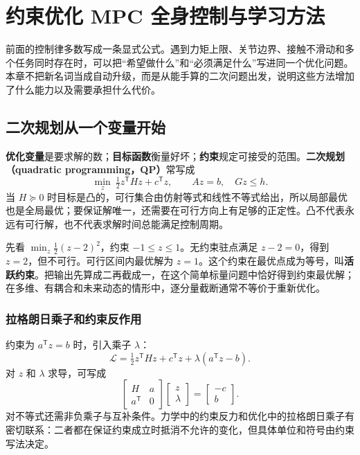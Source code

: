 \chapter{约束优化 MPC 全身控制与学习方法}
\label{ch:advanced}

前面的控制律多数写成一条显式公式。遇到力矩上限、关节边界、接触不滑动和多个任务同时存在时，可以把“希望做什么”和“必须满足什么”写进同一个优化问题。本章不把新名词当成自动升级，而是从能手算的二次问题出发，说明这些方法增加了什么能力以及需要承担什么代价。

\section{二次规划从一个变量开始}

\textbf{优化变量}是要求解的数；\textbf{目标函数}衡量好坏；\textbf{约束}规定可接受的范围。\textbf{二次规划（quadratic programming，QP）}常写成
\begin{equation}
\min_z\ \tfrac12z^\mathsf THz+c^\mathsf Tz,
\qquad Az=b,\quad Gz\le h.
\end{equation}
当 $H\succeq0$ 时目标是凸的，可行集合由仿射等式和线性不等式给出，所以局部最优也是全局最优；要保证解唯一，还需要在可行方向上有足够的正定性。凸不代表永远有可行解，也不代表求解时间总能满足控制周期。

先看 $\min_z\tfrac12(z-2)^2$，约束 $-1\le z\le1$。无约束驻点满足 $z-2=0$，得到 $z=2$，但不可行。可行区间内最优解为 $z=1$。这个约束在最优点成为等号，叫\textbf{活跃约束}。把输出先算成二再截成一，在这个简单标量问题中恰好得到约束最优解；在多维、有耦合和未来动态的情形中，逐分量截断通常不等价于重新优化。

\subsection{拉格朗日乘子和约束反作用}

约束为 $a^\mathsf Tz=b$ 时，引入乘子 $\lambda$：
\[
\mathcal L=\tfrac12z^\mathsf THz+c^\mathsf Tz+\lambda(a^\mathsf Tz-b).
\]
对 $z$ 和 $\lambda$ 求导，可写成
\begin{equation}
\begin{bmatrix}H&a\\a^\mathsf T&0\end{bmatrix}
\begin{bmatrix}z\\\lambda\end{bmatrix}
=\begin{bmatrix}-c\\b\end{bmatrix}.
\end{equation}
对不等式还需非负乘子与互补条件。力学中的约束反力和优化中的拉格朗日乘子有密切联系：二者都在保证约束成立时抵消不允许的变化，但具体单位和符号由约束写法决定。

